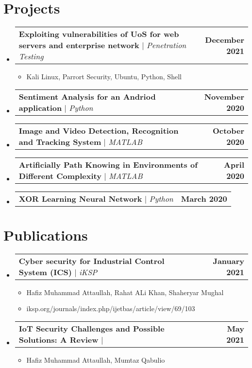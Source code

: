 \documentclass[letterpaper,11pt]{article}
\makeatletter
\newcommand{\resumeItem}[1]{
  \item\small{
    {#1 \vspace{-2pt}}
  }
}
\newcommand{\resumeProjectHeading}[2]{
    \item
    \begin{tabular*}{1.001\textwidth}{l@{\extracolsep{\fill}}r}
      \small#1 & \textbf{\small #2}\\
    \end{tabular*}\vspace{-7pt}
}
\newcommand{\resumeSubHeadingListStart}{\begin{itemize}[leftmargin=0.0in, label={}]}
\newcommand{\resumeSubHeadingListEnd}{\end{itemize}}
\newcommand{\resumeItemListStart}{\begin{itemize}}
\newcommand{\resumeItemListEnd}{\end{itemize}\vspace{-5pt}}
\makeatother
\begin{document}
\section{Projects}
    \vspace{-5pt}
    \resumeSubHeadingListStart
      \resumeProjectHeading
          {\textbf{Exploiting vulnerabilities of UoS for web servers and enterprise network} $|$ \emph{Penetration Testing}}{December 2021}
          \resumeItemListStart
            \resumeItem{Kali Linux, Parrort Security, Ubuntu, Python, Shell}
          \resumeItemListEnd
          \vspace{-13pt}
      \resumeProjectHeading
          {\textbf{Sentiment Analysis for an Andriod application} $|$ \emph{Python}}{November 2020}
          \resumeItemListStart
          \resumeItemListEnd 
          \vspace{-13pt}
          \resumeProjectHeading
          {\textbf{Image and Video Detection, Recognition and Tracking System} $|$ \emph{MATLAB}}{October 2020}
          \resumeItemListStart
          \resumeItemListEnd
          \vspace{-13pt}
          \resumeProjectHeading
          {\textbf{Artificially Path Knowing in Environments of Different Complexity} $|$ \emph{MATLAB}}{April 2020}
          \resumeItemListStart
          \resumeItemListEnd
          \vspace{-13pt}
          \resumeProjectHeading
          {\textbf{XOR Learning Neural Network} $|$ \emph{Python}}{March 2020}
          \resumeItemListStart
          \resumeItemListEnd
    \resumeSubHeadingListEnd
\vspace{-5pt}


%

\section{Publications}
    \vspace{-5pt}
    \resumeSubHeadingListStart
      \resumeProjectHeading
          {\textbf{Cyber security for Industrial Control System (ICS)} $|$ \emph{iKSP}}{January 2021}
          \resumeItemListStart
            \resumeItem{Hafiz Muhammad Attaullah, Rahat ALi Khan, Shaheryar Mughal}
            \resumeItem{iksp.org/journals/index.php/ijetbas/article/view/69/103}
          \resumeItemListEnd
          \vspace{-13pt}
      \resumeProjectHeading
          {\textbf{IoT Security Challenges and Possible Solutions: A Review} $|$ \emph{}}{May 2021}
          \resumeItemListStart
            \resumeItem{Hafiz Muhammad Attaullah, Mumtaz Qabulio}
          \resumeItemListEnd 
          \vspace{-13pt}
    \resumeSubHeadingListEnd
\vspace{-5pt}
\end{document}
